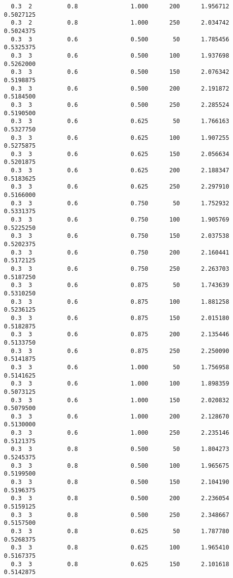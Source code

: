 \documentclass[
  letterpaper,
  DIV=11,
  numbers=noendperiod]{scrartcl}
\begin{document}
\begin{verbatim}
  0.3  2          0.8               1.000      200      1.956712  0.5027125
  0.3  2          0.8               1.000      250      2.034742  0.5024375
  0.3  3          0.6               0.500       50      1.785456  0.5325375
  0.3  3          0.6               0.500      100      1.937698  0.5262000
  0.3  3          0.6               0.500      150      2.076342  0.5198875
  0.3  3          0.6               0.500      200      2.191872  0.5184500
  0.3  3          0.6               0.500      250      2.285524  0.5190500
  0.3  3          0.6               0.625       50      1.766163  0.5327750
  0.3  3          0.6               0.625      100      1.907255  0.5275875
  0.3  3          0.6               0.625      150      2.056634  0.5201875
  0.3  3          0.6               0.625      200      2.188347  0.5183625
  0.3  3          0.6               0.625      250      2.297910  0.5166000
  0.3  3          0.6               0.750       50      1.752932  0.5331375
  0.3  3          0.6               0.750      100      1.905769  0.5225250
  0.3  3          0.6               0.750      150      2.037538  0.5202375
  0.3  3          0.6               0.750      200      2.160441  0.5172125
  0.3  3          0.6               0.750      250      2.263703  0.5187250
  0.3  3          0.6               0.875       50      1.743639  0.5310250
  0.3  3          0.6               0.875      100      1.881258  0.5236125
  0.3  3          0.6               0.875      150      2.015180  0.5182875
  0.3  3          0.6               0.875      200      2.135446  0.5133750
  0.3  3          0.6               0.875      250      2.250090  0.5141875
  0.3  3          0.6               1.000       50      1.756958  0.5141625
  0.3  3          0.6               1.000      100      1.898359  0.5073125
  0.3  3          0.6               1.000      150      2.020832  0.5079500
  0.3  3          0.6               1.000      200      2.128670  0.5130000
  0.3  3          0.6               1.000      250      2.235146  0.5121375
  0.3  3          0.8               0.500       50      1.804273  0.5245375
  0.3  3          0.8               0.500      100      1.965675  0.5199500
  0.3  3          0.8               0.500      150      2.104190  0.5196375
  0.3  3          0.8               0.500      200      2.236054  0.5159125
  0.3  3          0.8               0.500      250      2.348667  0.5157500
  0.3  3          0.8               0.625       50      1.787780  0.5268375
  0.3  3          0.8               0.625      100      1.965410  0.5167375
  0.3  3          0.8               0.625      150      2.101618  0.5142875

\end{verbatim}
\end{document}
